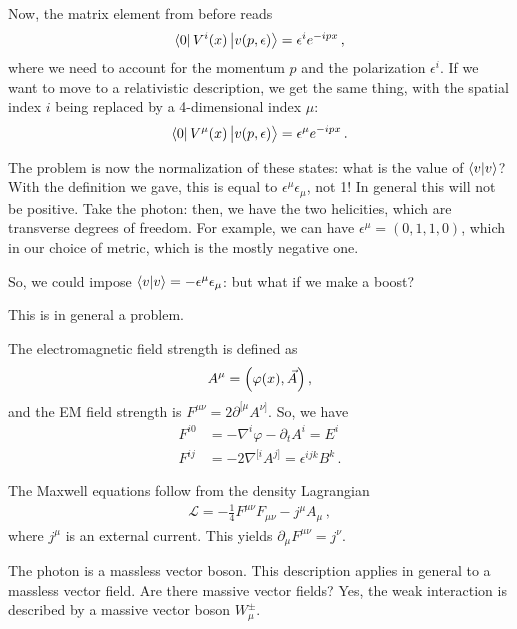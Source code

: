 \documentclass[main.tex]{subfiles}
\begin{document}
Now, the matrix element from before reads 
%
\begin{align}
\bra{0} V^{i}(x) \ket{v(p, \epsilon )} = \epsilon^{i} e^{-ipx}
\,,
\end{align}
%
where we need to account for the momentum \(p\) and the polarization \(\epsilon^{i} \). 
If we want to move to a relativistic description, we get the same thing, with the spatial index \(i\) being replaced by a 4-dimensional index \(\mu \):
%
\begin{align}
\bra{0} V^{\mu }(x) \ket{v(p, \epsilon )} = \epsilon^{\mu } e^{-ipx}
\,.
\end{align}

The problem is now the normalization of these states: what is the value of \(\braket{v}{v}\)? 
With the definition we gave, this is equal to \(\epsilon^{\mu } \epsilon_{\mu }\), not 1! 
In general this will not be positive. Take the photon: then, we have the two helicities, which are transverse degrees of freedom. 
For example, we can have \(\epsilon ^{\mu } = (0,1,1,0)\), which in our choice of metric, which is the mostly negative one. 

So, we could impose \(\braket{v}{v} = - \epsilon^{\mu } \epsilon_{\mu }\): but what if we make a boost?

This is in general a problem. 

The electromagnetic field strength is defined as 
%
\begin{align}
A^{\mu }  = \qty(\varphi (x), \vec{A})
\,,
\end{align}
%
and the EM field strength is \(F^{\mu \nu } = 2 \partial^{[\mu } A^{\nu ]}\). So, we have 
%
\begin{align}
F^{i0} &= - \nabla^{i} \varphi - \partial_{t} A^{i} = E^{i}  \\
 F^{ij} &=  - 2\nabla^{[i} A^{j]} = \epsilon^{ijk} B^{k}
\,.
\end{align}

The Maxwell equations follow from the density Lagrangian 
%
\begin{align}
\mathscr{L} = - \frac{1}{4} F^{\mu \nu } F_{\mu \nu } - j^{\mu } A_{\mu }
\,,
\end{align}
%
where \(j^{\mu }\) is an external current. This yields \(\partial_{\mu } F^{\mu \nu } = j^{\nu }\). 

The photon is a massless vector boson. This description applies in general to a massless vector field. 
Are there massive vector fields?
Yes, the weak interaction is described by a massive vector boson \(W^{\pm}_{\mu }\).
\end{document}

